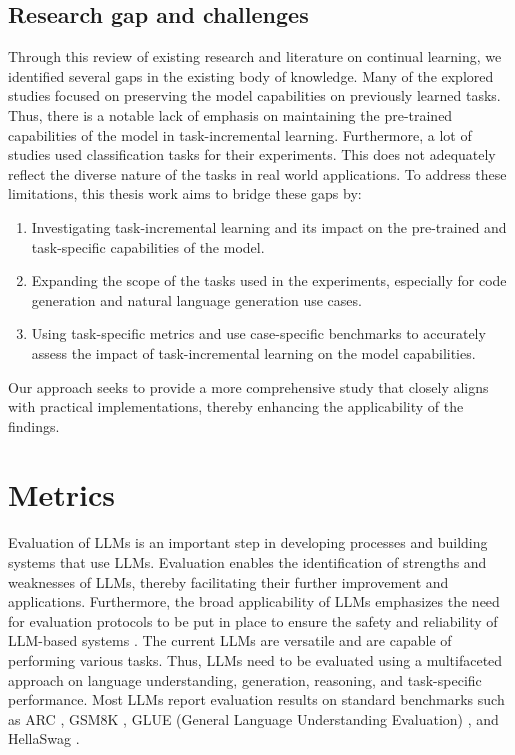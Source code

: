 \subsection{Research gap and challenges}
Through this review of existing research and literature on continual learning, we identified several gaps in the existing body of knowledge. Many of the explored studies focused on preserving the model capabilities on previously learned tasks. Thus, there is a notable lack of emphasis on maintaining the pre-trained capabilities of the model in task-incremental learning. Furthermore, a lot of studies used classification tasks for their experiments. This does not adequately reflect the diverse nature of the tasks in real world applications. To address these limitations, this thesis work aims to bridge these gaps by:
\begin{enumerate}
    \item Investigating task-incremental learning and its impact on the pre-trained and task-specific capabilities of the model.
    \item Expanding the scope of the tasks used in the experiments, especially for code generation and natural language generation use cases.
    \item Using task-specific metrics and use case-specific benchmarks to accurately assess the impact of task-incremental learning on the model capabilities.
\end{enumerate}
Our approach seeks to provide a more comprehensive study that closely aligns with practical implementations, thereby enhancing the applicability of the findings.






\section{Metrics} \label{metrics}

Evaluation of LLMs is an important step in developing processes and building systems that use LLMs. Evaluation enables the identification of strengths and weaknesses of LLMs, thereby facilitating their further improvement and applications. Furthermore, the broad applicability of LLMs emphasizes the need for evaluation protocols to be put in place to ensure the safety and reliability of LLM-based systems \cite{chang2024survey}. The current LLMs are versatile and are capable of performing various tasks. Thus, LLMs need to be evaluated using a multifaceted approach on language understanding, generation, reasoning, and task-specific performance. Most LLMs report evaluation results on standard benchmarks such as ARC \cite{clark2018think}, GSM8K \cite{zhang2024careful}, GLUE (General Language Understanding Evaluation) \cite{wang2018glue}, and HellaSwag \cite{zellers2019hellaswag}. 


